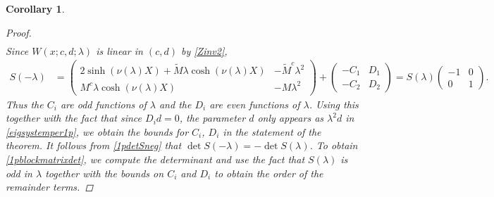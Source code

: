 \documentclass[11pt,reqno]{amsart}
\theoremstyle{plain}
\newtheorem{corollary}[theorem]{Corollary}
\theoremstyle{definition}
\theoremstyle{remark}
\begin{document}
\begin{corollary}
\begin{proof}
\begin{align*}
\end{align*}
Since $W(x; c, d; \lambda)$ is linear in $(c, d)$ by \cref{Zinv2}, 
\begin{align}\label{1pdetSneg}
S(-\lambda) &= 
\begin{pmatrix}
2 \sinh(\nu(\lambda) X) + \tilde{M}\lambda \cosh(\nu(\lambda) X) & -\tilde{M}^c \lambda^2 \\
M^c \lambda \cosh(\nu(\lambda)X) & - M \lambda^2
\end{pmatrix} +
\begin{pmatrix}
-C_1 & D_1 \\ -C_2 & D_2
\end{pmatrix}
= S(\lambda)\begin{pmatrix}-1 & 0 \\ 0 & 1 \end{pmatrix}.
\end{align}
Thus the $C_i$ are odd functions of $\lambda$ and the $D_i$ are even functions of $\lambda$. Using this together with the fact that since $D_i d = 0$, the parameter $d$ only appears as $\lambda^2 d$ in \cref{eigsystemper1p}, we obtain the bounds for $C_i$, $D_i$ in the statement of the theorem. It follows from \cref{1pdetSneg} that $\det S(-\lambda) = -\det S(\lambda)$. To obtain \cref{1pblockmatrixdet}, we compute the determinant and use the fact that $S(\lambda)$ is odd in $\lambda$ together with the bounds on $C_i$ and $D_i$ to obtain the order of the remainder terms.
\end{proof}
\end{corollary}
\end{document}
